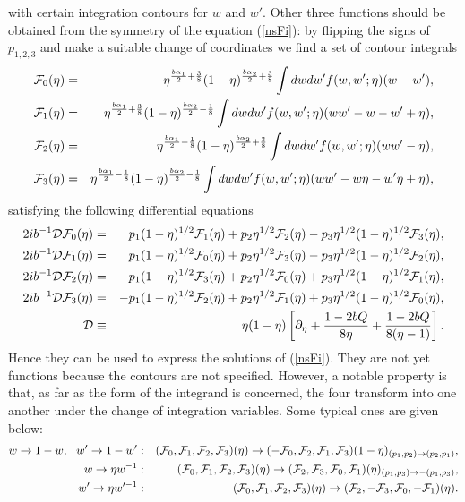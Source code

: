 \documentclass[a4paper,12pt]{article}
\newcommand{\cF}{{\cal F}}
\begin{document}
 with certain integration contours for $w$ and $w'$.
 Other three functions should be obtained from the symmetry
 of the equation (\ref{nsFi}): by flipping the signs of $p_{1,2,3}$
 and make a suitable change of coordinates we find a set of
 contour integrals
\begin{eqnarray}
  \cF_0(\eta) &=&
  \eta^{\frac{b\alpha_1}{2}+\frac{3}{8}}
  (1-\eta)^{\frac{b\alpha_2}{2}+\frac{3}{8}}
   \int dwdw'f(w,w';\eta)(w-w'),\nonumber\\
  \cF_1(\eta) &=&
  \eta^{\frac{b\alpha_1}{2}+\frac{3}{8}}
  (1-\eta)^{\frac{b\alpha_2}{2}-\frac{1}{8}}
   \int dwdw'f(w,w';\eta)(ww'-w-w'+\eta),\nonumber\\
  \cF_2(\eta) &=&
  \eta^{\frac{b\alpha_1}{2}-\frac{1}{8}}
  (1-\eta)^{\frac{b\alpha_2}{2}+\frac{3}{8}}
   \int dwdw'f(w,w';\eta)(ww'-\eta),\nonumber\\
  \cF_3(\eta) &=&
  \eta^{\frac{b\alpha_1}{2}-\frac{1}{8}}
  (1-\eta)^{\frac{b\alpha_2}{2}-\frac{1}{8}}
   \int dwdw'f(w,w';\eta)(ww'-w\eta-w'\eta+\eta),
\end{eqnarray}
 satisfying the following differential equations
\begin{eqnarray}
  2ib^{-1}{\cal D}\cF_0(\eta) &=&
 ~~p_1(1-\eta)^{1/2} \cF_1(\eta)
  +p_2 \eta^{1/2} \cF_2(\eta)
  -p_3 \eta^{1/2}(1-\eta)^{1/2}\cF_3(\eta),
     \nonumber \\
  2ib^{-1}{\cal D}\cF_1(\eta) &=&
 ~~p_1(1-\eta)^{1/2} \cF_0(\eta)
  +p_2 \eta^{1/2} \cF_3(\eta)
  -p_3 \eta^{1/2}(1-\eta)^{1/2}\cF_2(\eta),
     \nonumber \\
  2ib^{-1}{\cal D}\cF_2(\eta) &=&
  -p_1(1-\eta)^{1/2} \cF_3(\eta)
  +p_2 \eta^{1/2} \cF_0(\eta)
  +p_3 \eta^{1/2}(1-\eta)^{1/2}\cF_1(\eta),
     \nonumber \\
  2ib^{-1}{\cal D}\cF_3(\eta) &=&
  -p_1(1-\eta)^{1/2} \cF_2(\eta)
  +p_2 \eta^{1/2} \cF_1(\eta)
  +p_3 \eta^{1/2}(1-\eta)^{1/2}\cF_0(\eta),
     \nonumber \\
  {\cal D} &\equiv&
  \eta(1-\eta)\left[
    \partial_\eta + \frac{1-2bQ}{8\eta}+ \frac{1-2bQ}{8(\eta-1)}\right].
\end{eqnarray}
 Hence they can be used to express the solutions of (\ref{nsFi}).
 They are not yet functions because the contours are not specified.
 However, a notable property is that, as far as the form of
 the integrand is concerned, the four transform into one another
 under the change of integration variables.
 Some typical ones are given below:
\begin{eqnarray}
  w  \rightarrow 1-w,~~w' \rightarrow 1-w'  &:&
  ( \cF_0, \cF_1, \cF_2, \cF_3)(\eta) \rightarrow
  (-\cF_0, \cF_2, \cF_1, \cF_3)(1-\eta)_{(p_1,p_2)\rightarrow (p_2,p_1)},
 \nonumber \\
  w  \rightarrow \eta w ^{-1} &:&
  ( \cF_0, \cF_1, \cF_2, \cF_3)(\eta) \rightarrow
  ( \cF_2, \cF_3, \cF_0, \cF_1)(\eta)_{(p_1,p_3)\rightarrow -(p_1,p_3)},
 \nonumber \\
  w' \rightarrow \eta w'^{-1} &:&
  ( \cF_0, \cF_1, \cF_2, \cF_3)(\eta) \rightarrow
  ( \cF_2,-\cF_3, \cF_0,-\cF_1)(\eta).
\end{eqnarray}
\end{document}
